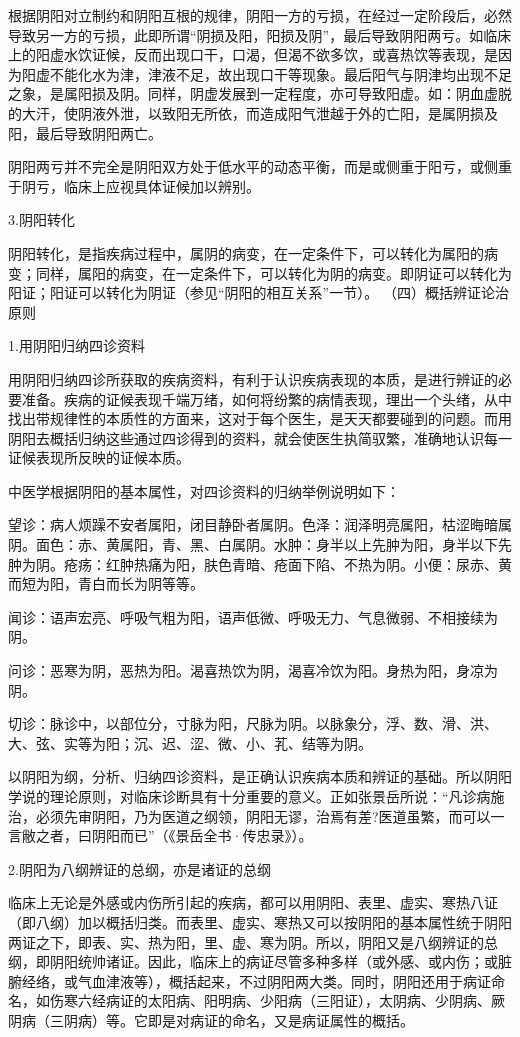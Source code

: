 \documentclass[a4paper,12pt,UTF8,twoside]{ctexbook}
\begin{document}
根据阴阳对立制约和阴阳互根的规律，阴阳一方的亏损，在经过一定阶段后，必然导致另一方的亏损，此即所谓“阴损及阳，阳损及阴”，最后导致阴阳两亏。如临床上的阳虚水饮证候，反而出现口干，口渴，但渴不欲多饮，或喜热饮等表现，是因为阳虚不能化水为津，津液不足，故出现口干等现象。最后阳气与阴津均出现不足之象，是属阳损及阴。同样，阴虚发展到一定程度，亦可导致阳虚。如：阴血虚脱的大汗，使阴液外泄，以致阳无所依，而造成阳气泄越于外的亡阳，是属阴损及阳，最后导致阴阳两亡。

阴阳两亏并不完全是阴阳双方处于低水平的动态平衡，而是或侧重于阳亏，或侧重于阴亏，临床上应视具体证候加以辨别。

3.阴阳转化

阴阳转化，是指疾病过程中，属阴的病变，在一定条件下，可以转化为属阳的病变；同样，属阳的病变，在一定条件下，可以转化为阴的病变。即阴证可以转化为阳证；阳证可以转化为阴证（参见“阴阳的相互关系”一节）。
（四）概括辨证论治原则

1.用阴阳归纳四诊资料

用阴阳归纳四诊所获取的疾病资料，有利于认识疾病表现的本质，是进行辨证的必要准备。疾病的证候表现千端万绪，如何将纷繁的病情表现，理出一个头绪，从中找出带规律性的本质性的方面来，这对于每个医生，是天天都要碰到的问题。而用阴阳去概括归纳这些通过四诊得到的资料，就会使医生执简驭繁，准确地认识每一证候表现所反映的证候本质。

中医学根据阴阳的基本属性，对四诊资料的归纳举例说明如下：

望诊：病人烦躁不安者属阳，闭目静卧者属阴。色泽：润泽明亮属阳，枯涩晦暗属阴。面色：赤、黄属阳，青、黑、白属阴。水肿：身半以上先肿为阳，身半以下先肿为阴。疮疡：红肿热痛为阳，肤色青暗、疮面下陷、不热为阴。小便：尿赤、黄而短为阳，青白而长为阴等等。

闻诊：语声宏亮、呼吸气粗为阳，语声低微、呼吸无力、气息微弱、不相接续为阴。

问诊：恶寒为阴，恶热为阳。渴喜热饮为阴，渴喜冷饮为阳。身热为阳，身凉为阴。

切诊：脉诊中，以部位分，寸脉为阳，尺脉为阴。以脉象分，浮、数、滑、洪、大、弦、实等为阳；沉、迟、涩、微、小、芤、结等为阴。

以阴阳为纲，分析、归纳四诊资料，是正确认识疾病本质和辨证的基础。所以阴阳学说的理论原则，对临床诊断具有十分重要的意义。正如张景岳所说：“凡诊病施治，必须先审阴阳，乃为医道之纲领，阴阳无谬，治焉有差?医道虽繁，而可以一言敝之者，曰阴阳而已”（《景岳全书·传忠录》）。

2.阴阳为八纲辨证的总纲，亦是诸证的总纲

临床上无论是外感或内伤所引起的疾病，都可以用阴阳、表里、虚实、寒热八证（即八纲）加以概括归类。而表里、虚实、寒热又可以按阴阳的基本属性统于阴阳两证之下，即表、实、热为阳，里、虚、寒为阴。所以，阴阳又是八纲辨证的总纲，即阴阳统帅诸证。因此，临床上的病证尽管多种多样（或外感、或内伤；或脏腑经络，或气血津液等），概括起来，不过阴阳两大类。同时，阴阳还用于病证命名，如伤寒六经病证的太阳病、阳明病、少阳病（三阳证），太阴病、少阴病、厥阴病（三阴病）等。它即是对病证的命名，又是病证属性的概括。
\end{document}
